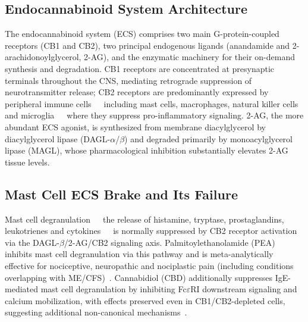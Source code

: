 \subsection{Endocannabinoid System Architecture}

The endocannabinoid system (ECS) comprises two main G-protein-coupled receptors (CB1 and CB2), two principal endogenous ligands (anandamide and 2-arachidonoylglycerol, 2-AG), and the enzymatic machinery for their on-demand synthesis and degradation. CB1 receptors are concentrated at presynaptic terminals throughout the CNS, mediating retrograde suppression of neurotransmitter release; CB2 receptors are predominantly expressed by peripheral immune cells~~~including mast cells, macrophages, natural killer cells and microglia~~~where they suppress pro-inflammatory signaling. 2-AG, the more abundant ECS agonist, is synthesized from membrane diacylglycerol by diacylglycerol lipase (DAGL-$\alpha$/$\beta$) and degraded primarily by monoacylglycerol lipase (MAGL), whose pharmacological inhibition substantially elevates 2-AG tissue levels.

\subsection{Mast Cell ECS Brake and Its Failure}

Mast cell degranulation~~~the release of histamine, tryptase, prostaglandins, leukotrienes and cytokines~~~is normally suppressed by CB2 receptor activation via the DAGL-$\beta$/2-AG/CB2 signaling axis. Palmitoylethanolamide (PEA) inhibits mast cell degranulation via this pathway and is meta-analytically effective for nociceptive, neuropathic and nociplastic pain (including conditions overlapping with ME/CFS)~\cite{Artukoglu2017PEA,LangIlievich2023PEA}. Cannabidiol (CBD) additionally suppresses IgE-mediated mast cell degranulation by inhibiting Fc$\varepsilon$RI downstream signaling and calcium mobilization, with effects preserved even in CB1/CB2-depleted cells, suggesting additional non-canonical mechanisms~\cite{YangCBD2024MastCell}.

